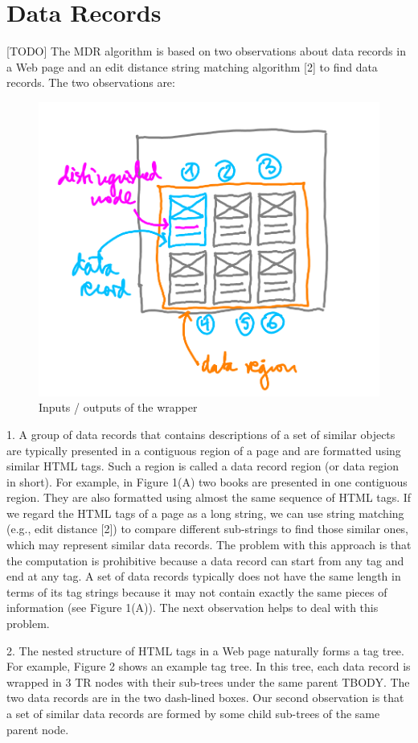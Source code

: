 \section{Data Records}

[TODO] The MDR algorithm is based on two observations about data
records in a Web page and an edit distance string matching
algorithm [2] to find data records. The two observations are:

\begin{figure}[h]
	\centering
	\includegraphics[width=0.5\linewidth]{figures/method}
	\caption{Inputs / outputs of the wrapper}
	\label{fig:method}
\end{figure}

1. A group of data records that contains descriptions of a set of
similar objects are typically presented in a contiguous region
of a page and are formatted using similar HTML tags. Such a
region is called a data record region (or data region in short).
For example, in Figure 1(A) two books are presented in one
contiguous region. They are also formatted using almost the
same sequence of HTML tags. If we regard the HTML tags of
a page as a long string, we can use string matching (e.g., edit
distance [2]) to compare different sub-strings to find those
similar ones, which may represent similar data records.
The problem with this approach is that the computation is
prohibitive because a data record can start from any tag and
end at any tag. A set of data records typically does not have
the same length in terms of its tag strings because it may not
contain exactly the same pieces of information (see Figure
1(A)). The next observation helps to deal with this problem.

2. The nested structure of HTML tags in a Web page naturally
forms a tag tree. For example, Figure 2 shows an example tag
tree. In this tree, each data record is wrapped in 3 TR nodes
with their sub-trees under the same parent TBODY. The two
data records are in the two dash-lined boxes. Our second
observation is that a set of similar data records are formed by
some child sub-trees of the same parent node.

